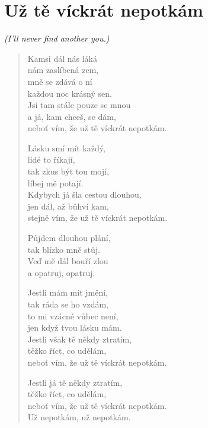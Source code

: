 \section*{Už tě víckrát nepotkám}
\textit{(I'll never find another you.)}

\begin{verse}
Kamsi dál nás láká \\
nám zaslíbená zem,\\
mně se zdává o ní\\
každou noc krásný sen.\\
Jsi tam stále pouze se mnou\\
a já, kam chceš, se dám,\\
neboť vím, že už tě víckrát nepotkám.

Lásku smí mít každý, \\
lidé to říkají, \\
tak zkus být tou mojí, \\
líbej mě potají. \\
Kdybych já šla cestou dlouhou, \\
jen dál, až bůhví kam, \\
stejně vím, že už tě víckrát nepotkám.

Půjdem dlouhou plání, \\
tak blízko mně stůj. \\
Veď mě dál bouří zlou \\
a opatruj, opatruj. 

Jestli mám mít jmění, \\
tak ráda se ho vzdám, \\
to mi vzácné vůbec není, \\
jen když tvou lásku mám. \\
Jestli však tě někdy ztratím, \\
těžko říct, co udělám, \\
neboť vím, že už tě víckrát nepotkám. 

Jestli já tě někdy ztratím, \\
těžko říct, co udělám, \\
neboť vím, že už tě víckrát nepotkám. \\
Už nepotkám, už nepotkám.
\end{verse}


